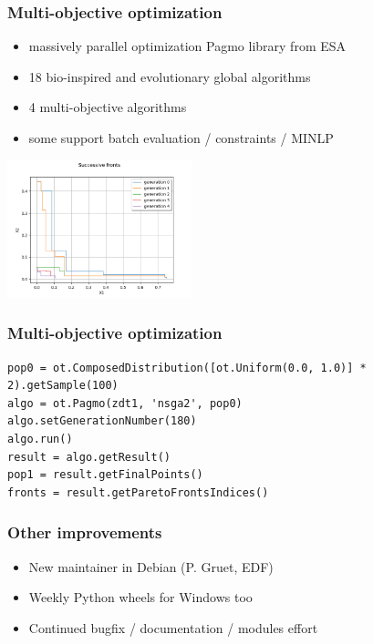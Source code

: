 \documentclass[aspectratio=169]{beamer}
\begin{document}
\begin{frame}[containsverbatim]
\frametitle{Multi-objective optimization}

% 

\begin{itemize}
\item massively parallel optimization Pagmo library from ESA
\item 18 bio-inspired and evolutionary global algorithms
\item 4 multi-objective algorithms
\item some support batch evaluation / constraints / MINLP
\end{itemize}

\begin{center}
\includegraphics[width=0.4\textwidth]{figures/sphx_glr_plot_optimization_pagmo_002.png}
\end{center}
\end{frame}


\begin{frame}[containsverbatim]
\frametitle{Multi-objective optimization}

\lstset{language=python}
\begin{lstlisting}
pop0 = ot.ComposedDistribution([ot.Uniform(0.0, 1.0)] * 2).getSample(100)
algo = ot.Pagmo(zdt1, 'nsga2', pop0)
algo.setGenerationNumber(180)
algo.run()
result = algo.getResult()
pop1 = result.getFinalPoints()
fronts = result.getParetoFrontsIndices()
\end{lstlisting}


\end{frame}




\begin{frame}
\frametitle{Other improvements}

\begin{itemize}
\item New maintainer in Debian (P. Gruet, EDF)
\item Weekly Python wheels for Windows too
\item Continued bugfix / documentation / modules effort
\end{itemize}

\end{frame}
\end{document}
